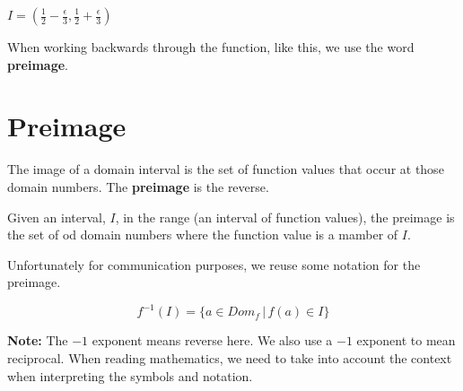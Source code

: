 \documentclass{ximera}
\begin{document}
$I = \left( \frac{1}{2} - \frac{\epsilon}{3}, \frac{1}{2} + \frac{\epsilon}{3} \right)$




When working backwards through the function, like this, we use the word \textbf{preimage}.



























\section{Preimage}




The image of a domain interval is the set of function values that occur at those domain numbers.  The \textbf{preimage} is the reverse.  

Given an interval, $I$, in the range (an interval of function values), the preimage is the set of od domain numbers where the function value is a mamber of $I$.

Unfortunately for communication purposes, we reuse some notation for the preimage.


\[       f^{-1}(I) = \{   a \in Dom_f  \, | \, f(a) \in I  \}             \]



\textbf{Note:}  The $-1$ exponent means reverse here.  We also use a $-1$ exponent to mean reciprocal.  When reading mathematics, we need to take into account the context when interpreting the symbols and notation.
\end{document}
